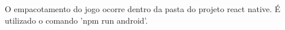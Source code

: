 O empacotamento do jogo ocorre dentro da pasta do projeto react native. É utilizado o comando 'npm run android'.


\begin{comment}
////
A respeito do jogo, como colher dados? Os dados são colhidos quando o jogador está utilizando o jogo. Porém o dados são mantidos apenas no dispositivo. A pessoa pode enviar a estatística quando desejar, o professor solicitará o envio constante dos dados dos alunos.

Como enviar estatísticas? Haverá um botão responsável de enviar estatísticas, que podem ser enviadas para o servidor através do jogo em apenas um clique e uma confirmação do jogador. Assim que enviadas, as estatísticas armazenadas no celular se apagam para que no próximo envio não hajam informações repetidas.

Os dados colhidos e enviados são separados fase e módulos.

Por pergunta:\\
	- Qual é a pergunta alvo\\
	- Número das 4 EDs\\
	- Quantas tentativas foram necessárias para acertar a pergunta. **para saber se clicam aleatório ou escolhem antes de clicar **\\
	- Tempo gasto em cada pergunta  **para saber se a tela não ficou parada e o celular sem atenção**\\

	Algumas observações são: o clique pode demorar para acontecer ou acontecer muito rápido e as consequências podem ser acertar de primeira ou não acertar de primeira.\\
	Algumas inferências são: 
	cliques muito rápidos e não acertar de primeira == PODE significar chute aleatório\\
	cliques muito rápidos e acertar de primeira == pode ser um robô? alunos muito bem preparados?\\
	cliques devagar e não acertar de primeira == tá muito difícil? O celular está parado? \\
	cliques devagar e acertar de primeira == estava pensando? Estava resolvendo? O celular estava parado?\\

Por fase:\\
	- Quanto tempo durou cada fase (de 20 perguntas)\\

Dentro de cada módulo:\\
	- Quantas vezes clickou para jogar em uma fase(linear,exata,etc..) de classificação e saiu? (após 3 \\segundos)
	- Quantas vezes clickou para jogar em uma fase(homog, exata, etc) de resolução e saiu? (após 3 \\segundos)
	- Tempo total no módulo de classificação\\
	- Tempo total no módulo de resolução\\
	- Quantas vezes entrou e saiu de cada módulo (considerar que saiu é após 3 segundos).\\



\end{comment}
